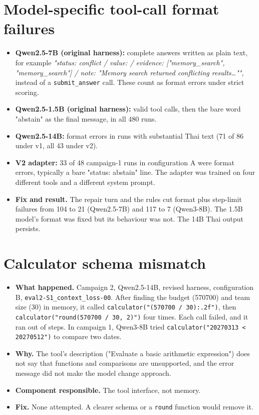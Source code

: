 \documentclass[10.5pt,a4paper,oneside]{report}
\begin{document}
\section{Model-specific tool-call format failures}
\begin{itemize}
\item \textbf{Qwen2.5-7B (original harness):} complete answers written as plain text, for example \emph{"status: conflict / value: / evidence: ["memory\_search", "memory\_search"] / note: "Memory search returned conflicting results…""}, instead of a \texttt{submit\_\allowbreak{}answer} call. These count as format errors under strict scoring.
\item \textbf{Qwen2.5-1.5B (original harness):} valid tool calls, then the bare word "abstain" as the final message, in all 480 runs.
\item \textbf{Qwen2.5-14B:} format errors in runs with substantial Thai text (71 of 86 under v1, all 43 under v2).
\item \textbf{V2 adapter:} 33 of 48 campaign-1 runs in configuration A were format errors, typically a bare "status: abstain" line. The adapter was trained on four different tools and a different system prompt.
\item \textbf{Fix and result.} The repair turn and the rules cut format plus step-limit failures from 104 to 21 (Qwen2.5-7B) and 117 to 7 (Qwen3-8B). The 1.5B model's format was fixed but its behaviour was not. The 14B Thai output persists.
\end{itemize}
\section{Calculator schema mismatch}
\begin{itemize}
\item \textbf{What happened.} Campaign 2, Qwen2.5-14B, revised harness, configuration B, \texttt{eval2-S1\_\allowbreak{}context\_\allowbreak{}loss-00}. After finding the budget (570700) and team size (30) in memory, it called \texttt{calculator("(570700 /\allowbreak{} 30):.\allowbreak{}2f")}, then \texttt{calculator("round(570700 /\allowbreak{} 30, 2)")} four times. Each call failed, and it ran out of steps. In campaign 1, Qwen3-8B tried \texttt{calculator("20270313 < 20270512")} to compare two dates.
\item \textbf{Why.} The tool's description ("Evaluate a basic arithmetic expression") does not say that functions and comparisons are unsupported, and the error message did not make the model change approach.
\item \textbf{Component responsible.} The tool interface, not memory.
\item \textbf{Fix.} None attempted. A clearer schema or a \texttt{round} function would remove it.
\end{itemize}
\end{document}
